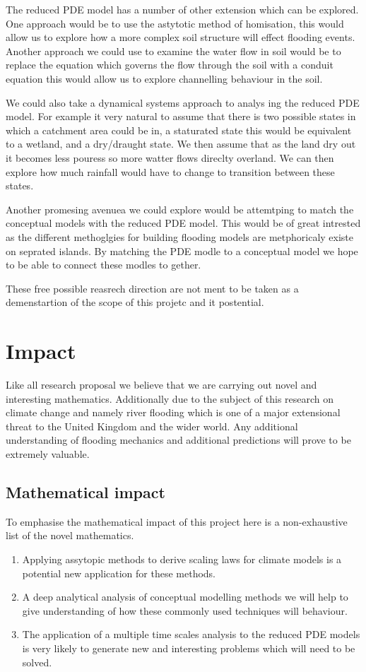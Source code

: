 \documentclass[11pt]{article}
\begin{document}
 The reduced PDE model has a number of other extension which can be explored. One approach would be to use the astytotic method of homisation, this would allow us to explore how a more complex soil structure will effect flooding events. Another approach we could use to examine the water flow in soil would be to replace the equation which governs the flow through the soil with a conduit equation this would allow us to explore channelling behaviour in the soil.

We could also take a dynamical systems approach to analys ing the reduced PDE model. For example it very natural to assume that there is two possible states in which a catchment area could be in, a staturated state this would be equivalent to a wetland, and a dry/draught state. We then assume that as the land dry out it becomes less pouress so more watter flows direclty overland. We can then explore how much rainfall would have to change to transition between these states.

Another promesing avenuea we could explore would be attemtping to match the conceptual models with the reduced PDE model. This would be of great intrested as the different methoglgies for building flooding models are metphoricaly existe on seprated islands. By matching the PDE modle to a conceptual model we hope to be able to connect these modles to gether.

These free possible reasrech direction are not ment to be taken as a demenstartion of the scope of this projetc and it postential.



\section{Impact}
Like all research proposal we believe that we are carrying out novel and interesting mathematics. Additionally due to the subject of this research on climate change and namely river flooding which is one of a major extensional threat to the United Kingdom and the wider world. Any additional understanding of flooding mechanics and additional predictions will prove to be extremely valuable.
\subsection{Mathematical impact}
To emphasise the mathematical impact of this project here is a non-exhaustive list of the novel mathematics. 
\begin{enumerate}
    \item Applying assytopic methods to derive scaling laws for climate models is a potential new application for these methods.
    \item A deep analytical analysis of conceptual modelling methods we will help to give understanding of how these commonly used techniques will behaviour.
    \item The application of a multiple time scales analysis to the reduced PDE models is very likely to generate new and interesting problems which will need to be solved.
\end{enumerate}
\end{document}
